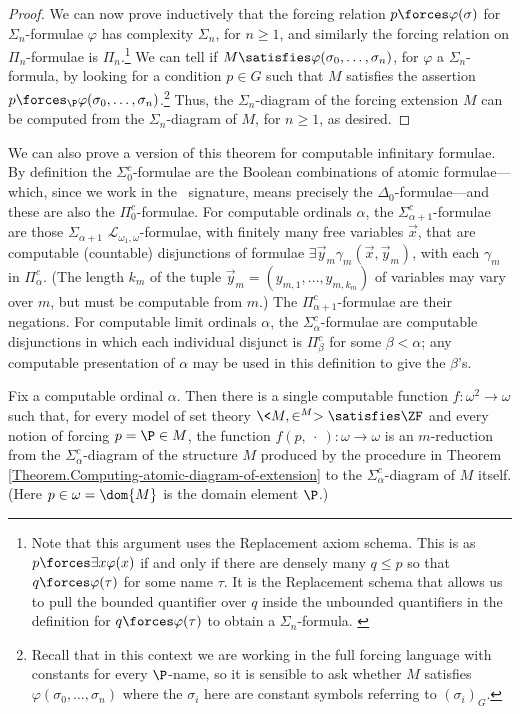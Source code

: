 \documentclass{amsart}
\newcommand{\xvec}{\vec{x}}
\newcommand{\yvec}{\vec{y}}
\begin{document}
\begin{proof}
 We can now prove inductively that the forcing relation $p\forces\varphi(\sigma)$ for $\Sigma_n$-formulae $\varphi$ has complexity $\Sigma_n$, for $n\geq 1$, and similarly the forcing relation on $\Pi_n$-formulae is $\Pi_n$.\footnote{Note that this argument uses the Replacement axiom schema. This is as $p \forces \exists x \varphi(x)$ if and only if there are densely many $q \le p$ so that $q \forces \varphi(\tau)$ for some name $\tau$. It is the Replacement schema that allows us to pull the bounded quantifier over $q$ inside the unbounded quantifiers in the definition for $q \forces \varphi(\tau)$ to obtain a $\Sigma_n$-formula. \label{Footnote.Replacement}}
 We can tell if $M\satisfies\varphi(\sigma_0,\ldots,\sigma_n)$, for $\varphi$ a $\Sigma_n$-formula, by looking for a condition $p\in G$ such that $M$ satisfies the assertion $p\forces_\P\varphi(\sigma_0,\ldots,\sigma_n)$.\footnote{Recall that in this context we are working in the full forcing language with constants for every $\P$-name, so it is sensible to ask whether $M$ satisfies $\varphi(\sigma_0,\ldots, \sigma_n)$ where the $\sigma_i$ here are constant symbols referring to $(\sigma_i)_G$.}
 Thus, the $\Sigma_n$-diagram of the forcing extension $M$ can be computed from the $\Sigma_n$-diagram of $M$, for $n\geq 1$, as desired.
 \end{proof}
 
 We can also prove a version of this theorem for computable infinitary formulae. By definition the $\Sigma_0^c$-formulae are the Boolean combinations of atomic formulae---which, since we work in the \Levy\ signature, means precisely the $\Delta_0$-formulae---and these are also the $\Pi_0^c$-formulae.  For computable ordinals $\alpha$, the $\Sigma_{\alpha+1}^c$-formulae are those $\Sigma_{\alpha+1}$ $\mathcal{L}_{\omega_1,\omega}$-formulae, with finitely many free variables $\xvec$, that are computable (countable) disjunctions of formulae $\exists \yvec_m \gamma_m(\xvec, \yvec_m)$, with each $\gamma_m$ in $\Pi_{\alpha}^c$. (The length $k_m$ of the tuple $\yvec_m=(y_{m,1},\ldots,y_{m,{k_m}})$ of variables may vary over $m$, but must be computable from $m$.) The $\Pi_{\alpha+1}^c$-formulae are their negations. For computable limit ordinals $\alpha$, the $\Sigma_{\alpha}^c$-formulae are computable disjunctions in which each individual disjunct is $\Pi_{\beta}^c$ for some $\beta < \alpha$; any computable presentation of $\alpha$ may be used in this definition to give the $\beta$'s.
 
 \begin{theorem} \label{Theorem.Computing-infinitary-diagram}
 Fix a computable ordinal $\alpha$.  Then there is a single computable function $f:\omega^2\to\omega$
 such that, for every model of set theory $\<M,\in^M>\satisfies\ZF$
 and every notion of forcing $p=\P\in M$, the function
 $f(p,~\cdot~):\omega\to\omega$ is an $m$-reduction from the $\Sigma_\alpha^c$-diagram
 of the structure $M$ produced by the procedure in
 Theorem \ref{Theorem.Computing-atomic-diagram-of-extension}
 to the $\Sigma_\alpha^c$-diagram of $M$ itself.
 (Here $p\in\omega=\dom{M}$ is the domain element $\P$.)
 \end{theorem}
 
\end{document}

